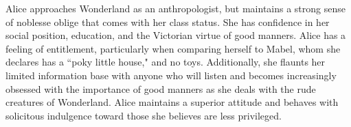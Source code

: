 \documentclass[a4paper]{twentysecondcv} %
\begin{document}
Alice approaches Wonderland as an anthropologist, but maintains a strong sense of noblesse oblige that comes with her class status. She has confidence in her social position, education, and the Victorian virtue of good manners. Alice has a feeling of entitlement, particularly when comparing herself to Mabel, whom she declares has a ``poky little house," and no toys. Additionally, she flaunts her limited information base with anyone who will listen and becomes increasingly obsessed with the importance of good manners as she deals with the rude creatures of Wonderland. Alice maintains a superior attitude and behaves with solicitous indulgence toward those she believes are less privileged.


%

\end{document}
